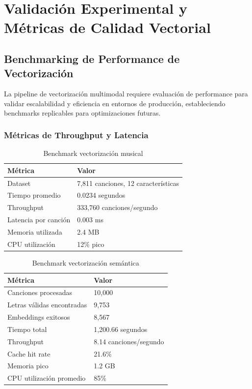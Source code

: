 \documentclass[12pt,a4paper]{report}
\begin{document}
\section{Validación Experimental y Métricas de Calidad Vectorial}

\subsection{Benchmarking de Performance de Vectorización}

La pipeline de vectorización multimodal requiere evaluación de performance para validar escalabilidad y eficiencia en entornos de producción, estableciendo benchmarks replicables para optimizaciones futuras.

\subsubsection{Métricas de Throughput y Latencia}

\begin{table}[h]
\centering
\caption{Benchmark vectorización musical}
\begin{tabular}{@{}ll@{}}
\toprule
\textbf{Métrica} & \textbf{Valor} \\
\midrule
Dataset & 7,811 canciones, 12 características \\
Tiempo promedio & 0.0234 segundos \\
Throughput & 333,760 canciones/segundo \\
Latencia por canción & 0.003 ms \\
Memoria utilizada & 2.4 MB \\
CPU utilización & 12\% pico \\
\bottomrule
\end{tabular}
\end{table}

\begin{table}[h]
\centering
\caption{Benchmark vectorización semántica}
\begin{tabular}{@{}ll@{}}
\toprule
\textbf{Métrica} & \textbf{Valor} \\
\midrule
Canciones procesadas & 10,000 \\
Letras válidas encontradas & 9,753 \\
Embeddings exitosos & 8,567 \\
Tiempo total & 1,200.66 segundos \\
Throughput & 8.14 canciones/segundo \\
Cache hit rate & 21.6\% \\
Memoria pico & 1.2 GB \\
CPU utilización promedio & 85\% \\
\bottomrule
\end{tabular}
\end{table}
\end{document}
